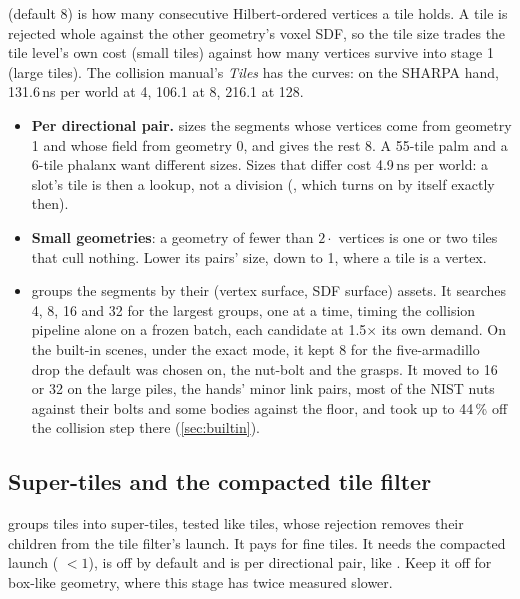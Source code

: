  (default 8) is how many consecutive Hilbert-ordered vertices a tile holds. A tile is rejected whole against the other geometry's voxel SDF, so the tile size trades the tile level's own cost (small tiles) against how many vertices survive into stage 1 (large tiles). The collision manual's \emph{Tiles} has the curves: on the SHARPA hand, 131.6\,ns per world at 4, 106.1 at 8, 216.1 at 128.

\begin{itemize}
\item \textbf{Per directional pair.}  sizes the segments whose vertices come from geometry 1 and whose field from geometry 0, and gives the rest 8. A 55-tile palm and a 6-tile phalanx want different sizes. Sizes that differ cost 4.9\,ns per world: a slot's tile is then a lookup, not a division (, which  turns on by itself exactly then).
\item \textbf{Small geometries}: a geometry of fewer than $2\cdot$ vertices is one or two tiles that cull nothing. Lower its pairs' size, down to 1, where a tile is a vertex.
\item {} groups the segments by their (vertex surface, SDF surface) assets. It searches 4, 8, 16 and 32 for the largest groups, one at a time, timing the collision pipeline alone on a frozen batch, each candidate at 1.5$\times$ its own demand. On the built-in scenes, under the exact mode, it kept 8 for the five-armadillo drop the default was chosen on, the nut-bolt and the grasps. It moved to 16 or 32 on the large piles, the hands' minor link pairs, most of the NIST nuts against their bolts and some bodies against the floor, and took up to 44\,\% off the collision step there (\cref{sec:builtin}).
\end{itemize}

\subsection{Super-tiles and the compacted tile filter}\label{sec:supertiles}

 groups tiles into super-tiles, tested like tiles, whose rejection removes their children from the tile filter's launch. It pays for fine tiles. It needs the compacted launch ( $< 1$), is off by default and is per directional pair, like . Keep it off for box-like geometry, where this stage has twice measured slower.

